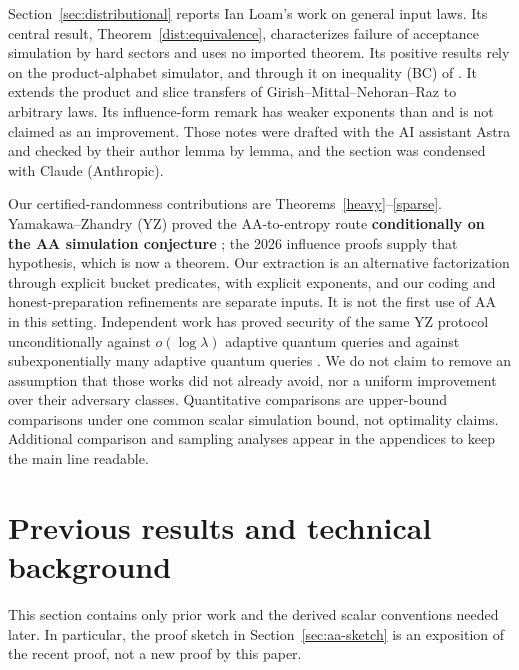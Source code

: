 \documentclass[11pt]{article}
\theoremstyle{definition}\newtheorem{definition}[theorem]{Definition}
\theoremstyle{remark}\newtheorem{remark}[theorem]{Remark}
\begin{document}
Section~\ref{sec:distributional} reports Ian Loam's work on general input laws. Its central result, Theorem~\ref{dist:equivalence}, characterizes failure of acceptance simulation by hard sectors and uses no imported theorem. Its positive results rely on the product-alphabet simulator, and through it on inequality (BC) of \cite{HMP26}. It extends the product and slice transfers of Girish--Mittal--Nehoran--Raz \cite{GMNR26} to arbitrary laws. Its influence-form remark has weaker exponents than \cite{Tur26} and is not claimed as an improvement. Those notes were drafted with the AI assistant Astra and checked by their author lemma by lemma, and the section was condensed with Claude (Anthropic).

Our certified-randomness contributions are Theorems~\ref{heavy}--\ref{sparse}. Yamakawa--Zhandry (YZ) proved the AA-to-entropy route \textbf{conditionally on the AA simulation conjecture} \cite[Theorem 8.4 and Conjecture 8.1]{YZ24}; the 2026 influence proofs supply that hypothesis, which is now a theorem. Our extraction is an alternative factorization through explicit bucket predicates, with explicit exponents, and our coding and honest-preparation refinements are separate inputs. It is not the first use of AA in this setting. Independent work has proved security of the same YZ protocol unconditionally against $o(\log\lambda)$ adaptive quantum queries and against subexponentially many adaptive quantum queries \cite{KRT26,CKMRSST26}. We do not claim to remove an assumption that those works did not already avoid, nor a uniform improvement over their adversary classes. Quantitative comparisons are upper-bound comparisons under one common scalar simulation bound, not optimality claims. Additional comparison and sampling analyses appear in the appendices to keep the main line readable.

\section{Previous results and technical background}\label{sec:background}
This section contains only prior work and the derived scalar conventions needed later. In particular, the proof sketch in Section~\ref{sec:aa-sketch} is an exposition of the recent proof, not a new proof by this paper.
\end{document}
